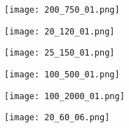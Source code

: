 \documentclass[11pt, oneside]{article}
\begin{document}
\begin{center}
\begin{minipage}{1.0\linewidth}
\texttt{[image: 200\_750\_01.png]}
\end{minipage}%

\qquad

\qquad

\begin{minipage}{1.0\linewidth}
\texttt{[image: 20\_120\_01.png]}
\end{minipage}

\qquad

\qquad

\begin{minipage}{1.0\linewidth}
\texttt{[image: 25\_150\_01.png]}
\end{minipage}

\qquad

\qquad

\begin{minipage}{1.0\linewidth}
\texttt{[image: 100\_500\_01.png]}
\end{minipage}

\qquad

\qquad

\begin{minipage}{1.0\linewidth}
\texttt{[image: 100\_2000\_01.png]}
\end{minipage}

\qquad

\qquad

\begin{minipage}{1.0\linewidth}
\texttt{[image: 20\_60\_06.png]}
\end{minipage}

\qquad

\qquad

\end{center}
\end{document}
